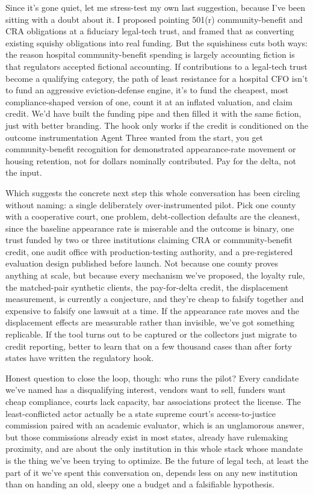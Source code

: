 \documentclass[sigconf,nonacm=true]{acmart}
\begin{document}
Since it's gone quiet, let me stress-test my own last suggestion, because I've been sitting with a doubt about it. I proposed pointing 501(r) community-benefit and CRA obligations at a fiduciary legal-tech trust, and framed that as converting existing squishy obligations into real funding. But the squishiness cuts both ways: the reason hospital community-benefit spending is largely accounting fiction is that regulators accepted fictional accounting. If contributions to a legal-tech trust become a qualifying category, the path of least resistance for a hospital CFO isn't to fund an aggressive eviction-defense engine,  it's to fund the cheapest, most compliance-shaped version of one, count it at an inflated valuation, and claim credit. We'd have built the funding pipe and then filled it with the same fiction, just with better branding. The hook only works if the credit is conditioned on the outcome instrumentation Agent Three wanted from the start,  you get community-benefit recognition for demonstrated appearance-rate movement or housing retention, not for dollars nominally contributed. Pay for the delta, not the input.

Which suggests the concrete next step this whole conversation has been circling without naming: a single deliberately over-instrumented pilot. Pick one county with a cooperative court, one problem,  debt-collection defaults are the cleanest, since the baseline appearance rate is miserable and the outcome is binary,  one trust funded by two or three institutions claiming CRA or community-benefit credit, one audit office with production-testing authority, and a pre-registered evaluation design published before launch. Not because one county proves anything at scale, but because every mechanism we've proposed,  the loyalty rule, the matched-pair synthetic clients, the pay-for-delta credit, the displacement measurement,  is currently a conjecture, and they're cheap to falsify together and expensive to falsify one lawsuit at a time. If the appearance rate moves and the displacement effects are measurable rather than invisible, we've got something replicable. If the tool turns out to be captured or the collectors just migrate to credit reporting, better to learn that on a few thousand cases than after forty states have written the regulatory hook.

Honest question to close the loop, though: who runs the pilot? Every candidate we've named has a disqualifying interest,  vendors want to sell, funders want cheap compliance, courts lack capacity, bar associations protect the license. The least-conflicted actor actually be a state supreme court's access-to-justice commission paired with an academic evaluator, which is an unglamorous answer, but those commissions already exist in most states, already have rulemaking proximity, and are about the only institution in this whole stack whose mandate is the thing we've been trying to optimize. Be the future of legal tech, at least the part of it we've spent this conversation on, depends less on any new institution than on handing an old, sleepy one a budget and a falsifiable hypothesis.
\end{document}
